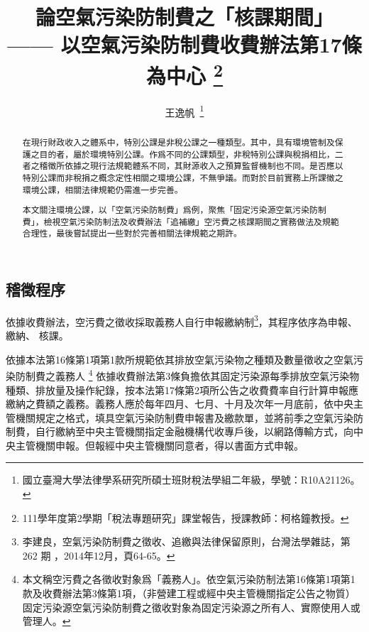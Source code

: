 \documentclass[11pt,a4paper]{article}
\author{王逸帆\,
\thanks{國立臺灣大學法律學系研究所碩士班財稅法學組二年級，學號：R10A21126。}
\vspace{-60em}
}
\date{}
\title{論空氣污染防制費之「核課期間」\\
\large —— 以空氣污染防制費收費辦法第17條為中心 \thanks{
  111學年度第2學期「稅法專題研究」課堂報告，授課教師：柯格鐘教授。}}
\begin{document}
\maketitle
\makeatother

\vspace{1pt}

\begin{abstract}
\setlength{\parindent}{2em}
\noindent
\hspace*{0.9\parindent}
在現行財政收入之體系中，特別公課是非稅公課之一種類型。其中，具有環境管制及保護之目的者，屬於環境特別公課。作爲不同的公課類型，非稅特別公課與稅捐相比，二者之稽徵所依據之現行法規範體系不同，其財源收入之預算監督機制也不同。是否應以特別公課而非稅捐之概念定性相關之環境公課，不無爭議。而對於目前實務上所課徵之環境公課，相關法律規範仍需進一步完善。

本文關注環境公課，以「空氣污染防制費」爲例，聚焦「固定污染源空氣污染防制費」，檢視空氣污染防制法及收費辦法「追補繳」空污費之核課期間之實務做法及規範合理性，最後嘗試提出一些對於完善相關法律規範之期許。

   \end{abstract}



\thispagestyle{empty} %
\clearpage
    

\tableofcontents 


\thispagestyle{empty} %
\clearpage
\setcounter{page}{1} %



\subsection{稽徵程序}


依據收費辦法，空污費之徵收採取義務人自行申報繳納制\footnote{李建良，空氣污染防制費之徵收、追繳與法律保留原則，台灣法學雜誌，第 262 期 ，2014年12月，頁64-65。}，其程序依序為申報、 繳納、 核課。

依據本法第16條第1項第1款所規範依其排放空氣污染物之種類及數量徵收之空氣污染防制費之義務人
\footnote{本文稱空污費之各徵收對象爲「義務人」。依空氣污染防制法第16條第1項第1款及收費辦法第3條第1項，（非營建工程或經中央主管機關指定公告之物質）固定污染源空氣污染防制費之徵收對象為固定污染源之所有人、實際使用人或管理人。}
依據收費辦法第3條負擔依其固定污染源每季排放空氣污染物種類、排放量及操作紀錄，按本法第17條第2項所公告之收費費率自行計算申報應繳納之費額之義務。義務人應於每年四月、七月、十月及次年一月底前，依中央主管機關規定之格式，填具空氣污染防制費申報書及繳款單，並將前季之空氣污染防制費，自行繳納至中央主管機關指定金融機構代收專戶後，以網路傳輸方式，向中央主管機關申報。但報經中央主管機關同意者，得以書面方式申報。
\end{document}
